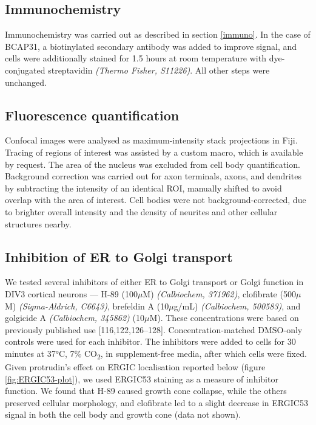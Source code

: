 \documentclass[
  12pt,
  a4paper,
]{book}
\begin{document}
\hypertarget{immunochemistry}{%
\subsection{Immunochemistry}\label{immunochemistry}}

Immunochemistry was carried out as described in section \ref{immuno}. In the case of BCAP31, a biotinylated secondary antibody was added to improve signal, and cells were additionally stained for 1.5 hours at room temperature with dye-conjugated streptavidin \emph{(Thermo Fisher, S11226)}. All other steps were unchanged.

\hypertarget{fluorescence-quantification}{%
\subsection{Fluorescence quantification}\label{fluorescence-quantification}}

Confocal images were analysed as maximum-intensity stack projections in Fiji. Tracing of regions of interest was assisted by a custom macro, which is available by request. The area of the nucleus was excluded from cell body quantification. Background correction was carried out for axon terminals, axons, and dendrites by subtracting the intensity of an identical ROI, manually shifted to avoid overlap with the area of interest. Cell bodies were not background-corrected, due to brighter overall intensity and the density of neurites and other cellular structures nearby.

\hypertarget{inhibition-of-er-to-golgi-transport}{%
\subsection{Inhibition of ER to Golgi transport}\label{inhibition-of-er-to-golgi-transport}}

We tested several inhibitors of either ER to Golgi transport or Golgi function in DIV3 cortical neurons --- H-89 (100\(\mu\)M) \emph{(Calbiochem, 371962)}, clofibrate (500\(\mu\)M) \emph{(Sigma-Aldrich, C6643)}, brefeldin A (10\(\mu\)g/mL) \emph{(Calbiochem, 500583)}, and golgicide A \emph{(Calbiochem, 345862)} (10\(\mu\)M). These concentrations were based on previously published use {[}116,122,126--128{]}. Concentration-matched DMSO-only controls were used for each inhibitor. The inhibitors were added to cells for 30 minutes at 37°C, 7\% CO\textsubscript{2}, in supplement-free media, after which cells were fixed. Given protrudin's effect on ERGIC localisation reported below (figure \ref{fig:ERGIC53-plot}), we used ERGIC53 staining as a measure of inhibitor function. We found that H-89 caused growth cone collapse, while the others preserved cellular morphology, and clofibrate led to a slight decrease in ERGIC53 signal in both the cell body and growth cone (data not shown).
\end{document}
